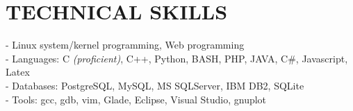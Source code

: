 \section{TECHNICAL SKILLS}
\vspace{0.07in}
- Linux system/kernel programming, Web programming
\vspace{0.04in}\\
- Languages: C {\footnotesize \it (proficient)}, C++, Python, BASH, PHP, JAVA, C\#,
	Javascript, Latex
\vspace{0.04in}\\
- Databases: PostgreSQL, MySQL, MS SQLServer, IBM DB2, SQLite
\vspace{0.04in}\\
- Tools: gcc, gdb, vim, Glade, Eclipse, Visual Studio, gnuplot

